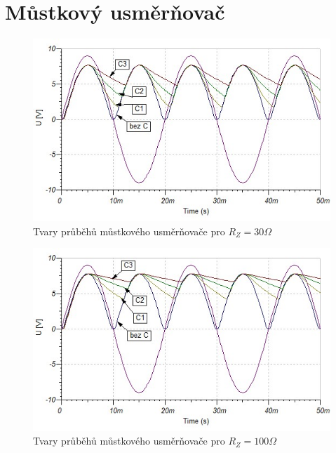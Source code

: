 \documentclass[12pt]{article} %
\begin{document}
\section{Můstkový usměrňovač}
\begin{figure}[H]
\center
\includegraphics[scale=0.7]{mustkovy30.jpg}
\caption{Tvary průběhů můstkového usměrňovače pro $R_Z = 30\Omega$}
\end{figure}

\begin{figure}[H]
\center
\includegraphics[scale=0.7]{mustkovy100.jpg}
\caption{Tvary průběhů můstkového usměrňovače pro $R_Z = 100\Omega$}
\end{figure}
\end{document}
